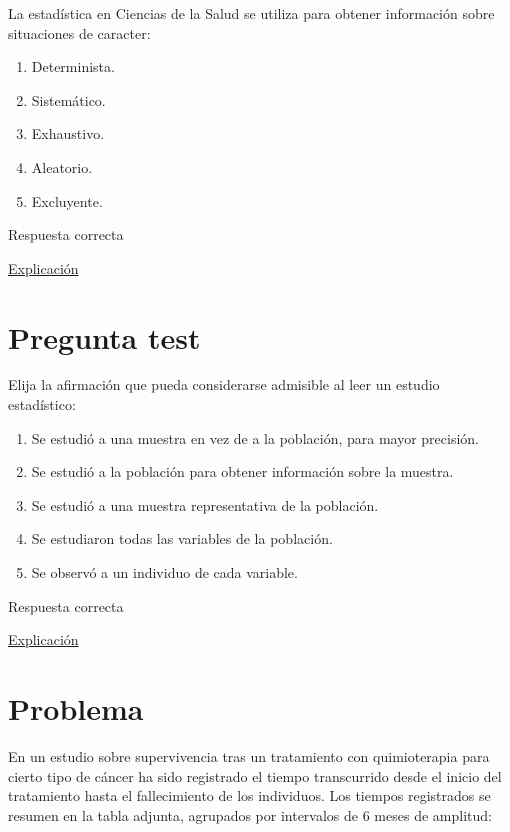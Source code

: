 \documentclass[
]{book}
\providecommand{\tightlist}{%
  \setlength{\itemsep}{0pt}\setlength{\parskip}{0pt}}
\begin{document}
La estadística en Ciencias de la Salud se utiliza para obtener información sobre situaciones de caracter:

\begin{enumerate}
\def\labelenumi{\alph{enumi})}
\tightlist
\item
  Determinista.
\item
  Sistemático.
\item
  Exhaustivo.
\item
  Aleatorio.
\item
  Excluyente.
\end{enumerate}

Respuesta correcta

\href{https://1fjmanzano.github.io/bioestadistica/inferencia-estad\%C3\%ADstica.html}{Explicación}

\hypertarget{pregunta-test-18}{%
\section{Pregunta test}\label{pregunta-test-18}}

Elija la afirmación que pueda considerarse admisible al leer un estudio estadístico:

\begin{enumerate}
\def\labelenumi{\alph{enumi})}
\tightlist
\item
  Se estudió a una muestra en vez de a la población, para mayor precisión.
\item
  Se estudió a la población para obtener información sobre la muestra.
\item
  Se estudió a una muestra representativa de la población.
\item
  Se estudiaron todas las variables de la población.
\item
  Se observó a un individuo de cada variable.
\end{enumerate}

Respuesta correcta

\href{https://1fjmanzano.github.io/bioestadistica/me\%CC\%81todos-de-muestreo.html}{Explicación}

\hypertarget{problema-3}{%
\section{Problema}\label{problema-3}}

En un estudio sobre supervivencia tras un tratamiento con quimioterapia para cierto tipo de cáncer ha sido registrado el tiempo transcurrido desde el inicio del tratamiento hasta el fallecimiento de los individuos. Los tiempos registrados se resumen en la tabla adjunta, agrupados por intervalos de 6 meses de amplitud:
\end{document}
